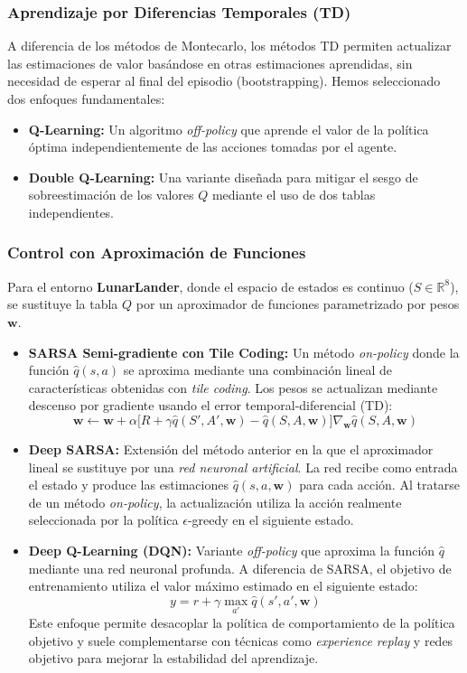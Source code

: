 \subsubsection{Aprendizaje por Diferencias Temporales (TD)}
A diferencia de los métodos de Montecarlo, los métodos TD permiten actualizar las estimaciones de valor basándose en otras estimaciones aprendidas, sin necesidad de esperar al final del episodio (bootstrapping). Hemos seleccionado dos enfoques fundamentales:
\begin{itemize}
\item \textbf{Q-Learning:} Un algoritmo \textit{off-policy} que aprende el valor de la política óptima independientemente de las acciones tomadas por el agente.
\item \textbf{Double Q-Learning:} Una variante diseñada para mitigar el sesgo de sobreestimación de los valores $Q$ mediante el uso de dos tablas independientes.
\end{itemize}

\subsubsection{Control con Aproximación de Funciones}
Para el entorno \textbf{LunarLander}, donde el espacio de estados es continuo ($S \in \mathbb{R}^8$), se sustituye la tabla $Q$ por un aproximador de funciones parametrizado por pesos $\mathbf{w}$.

\begin{itemize}
\item \textbf{SARSA Semi-gradiente con Tile Coding:} Un método \textit{on-policy} donde la función $\hat{q}(s,a)$ se aproxima mediante una combinación lineal de características obtenidas con \textit{tile coding}. Los pesos se actualizan mediante descenso por gradiente usando el error temporal-diferencial (TD):
\[
\mathbf{w} \leftarrow \mathbf{w} + \alpha \big[R + \gamma \hat{q}(S',A',\mathbf{w}) - \hat{q}(S,A,\mathbf{w})\big]\nabla_{\mathbf{w}} \hat{q}(S,A,\mathbf{w})
\]

\item \textbf{Deep SARSA:} Extensión del método anterior en la que el aproximador lineal se sustituye por una \textit{red neuronal artificial}. La red recibe como entrada el estado y produce las estimaciones $\hat{q}(s,a,\mathbf{w})$ para cada acción. Al tratarse de un método \textit{on-policy}, la actualización utiliza la acción realmente seleccionada por la política $\epsilon$-greedy en el siguiente estado.

\item \textbf{Deep Q-Learning (DQN):} Variante \textit{off-policy} que aproxima la función $\hat{q}$ mediante una red neuronal profunda. A diferencia de SARSA, el objetivo de entrenamiento utiliza el valor máximo estimado en el siguiente estado:
\[
y = r + \gamma \max_{a'} \hat{q}(s',a',\mathbf{w})
\]
Este enfoque permite desacoplar la política de comportamiento de la política objetivo y suele complementarse con técnicas como \textit{experience replay} y redes objetivo para mejorar la estabilidad del aprendizaje.
\end{itemize}


